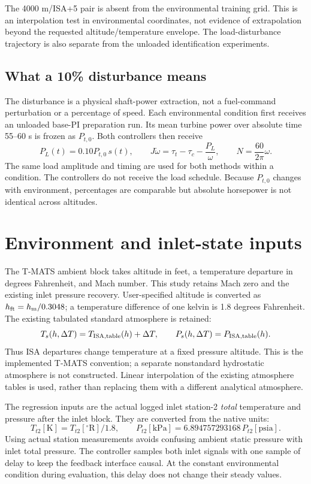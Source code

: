 \documentclass[11pt,a4paper]{article}
\begin{document}
The 4000 m/ISA+5 pair is absent from the environmental training grid. This is an interpolation test in environmental coordinates, not evidence of extrapolation beyond the requested altitude/temperature envelope. The load-disturbance trajectory is also separate from the unloaded identification experiments.

\subsection{What a 10\% disturbance means}
The disturbance is a physical shaft-power extraction, not a fuel-command perturbation or a percentage of speed. Each environmental condition first receives an unloaded base-PI preparation run. Its mean turbine power over absolute time 55--60 s is frozen as $P_{t,0}$. Both controllers then receive
\begin{equation}
P_L(t)=0.10P_{t,0}\,s(t),\qquad
J\dot\omega=\tau_t-\tau_c-\frac{P_L}{\omega},\qquad N=\frac{60}{2\pi}\omega.
\end{equation}
The same load amplitude and timing are used for both methods within a condition. The controllers do not receive the load schedule. Because $P_{t,0}$ changes with environment, percentages are comparable but absolute horsepower is not identical across altitudes.

\clearpage
\section{Environment and inlet-state inputs}
The T-MATS ambient block takes altitude in feet, a temperature departure in degrees Fahrenheit, and Mach number. This study retains Mach zero and the existing inlet pressure recovery. User-specified altitude is converted as $h_{\rm ft}=h_{\rm m}/0.3048$; a temperature difference of one kelvin is 1.8 degrees Fahrenheit. The existing tabulated standard atmosphere is retained:
\begin{equation}
T_s(h,\Delta T)=T_{\rm ISA,table}(h)+\Delta T,\qquad
P_s(h,\Delta T)=P_{\rm ISA,table}(h).
\end{equation}
Thus ISA departures change temperature at a fixed pressure altitude. This is the implemented T-MATS convention; a separate nonstandard hydrostatic atmosphere is not constructed. Linear interpolation of the existing atmosphere tables is used, rather than replacing them with a different analytical atmosphere.

The regression inputs are the actual logged inlet station-2 \emph{total} temperature and pressure after the inlet block. They are converted from the native units:
\begin{equation}
T_{t2}[\mathrm K]=T_{t2}[{}^\circ\mathrm R]/1.8,
\qquad P_{t2}[\mathrm{kPa}]=6.894757293168\,P_{t2}[\mathrm{psia}].
\end{equation}
Using actual station measurements avoids confusing ambient static pressure with inlet total pressure. The controller samples both inlet signals with one sample of delay to keep the feedback interface causal. At the constant environmental condition during evaluation, this delay does not change their steady values.
\end{document}
